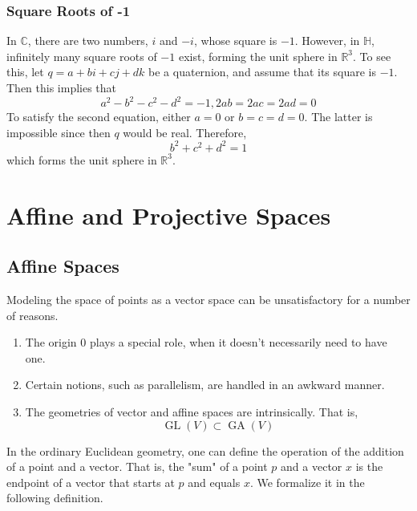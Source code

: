 \documentclass{article}
\DeclareMathOperator{\GL}{GL}
\DeclareMathOperator{\GA}{GA}
\begin{document}
    \subsubsection{Square Roots of -1}

      In $\mathbb{C}$, there are two numbers, $i$ and $-i$, whose square is $-1$. However, in $\mathbb{H}$, infinitely many square roots of $-1$ exist, forming the unit sphere in $\mathbb{R}^3$. To see this, let $q = a+bi+cj+dk$ be a quaternion, and assume that its square is $-1$. Then this implies that
      \[a^2 - b^2 -c^2 -d^2 = -1, 2ab = 2ac = 2ad = 0\]
      To satisfy the second equation, either $a=0$ or $b=c=d=0$. The latter is impossible since then $q$ would be real. Therefore, 
      \[b^2 + c^2 + d^2 = 1\]
      which forms the unit sphere in $\mathbb{R}^3$. 

\section{Affine and Projective Spaces}

  \subsection{Affine Spaces}

    Modeling the space of points as a vector space can be unsatisfactory for a number of reasons. 
    \begin{enumerate}
        \item The origin $0$ plays a special role, when it doesn't necessarily need to have one. 
        \item Certain notions, such as parallelism, are handled in an awkward manner. 
        \item The geometries of vector and affine spaces are intrinsically. That is, 
        \[\GL(V) \subset \GA(V)\]
    \end{enumerate}

    In the ordinary Euclidean geometry, one can define the operation of the addition of a point and a vector. That is, the "sum" of a point $p$ and a vector $x$ is the endpoint of a vector that starts at $p$ and equals $x$. We formalize it in the following definition. 
\end{document}
